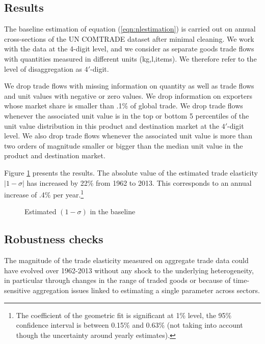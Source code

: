 \documentclass[12pt,twoside,a4paper,notitlepage]{article}
\begin{document}
\subsection{Results}

The baseline estimation of equation (\ref{eqn:nlestimation}) is carried out on annual cross-sections of the UN COMTRADE dataset after minimal cleaning. 
We work with the data at the 4-digit level, and we consider as separate goods trade flows with quantities measured in different units (kg,l,items). 
We therefore refer to the level of disaggregation as $4'$-digit.

We drop trade flows with missing information on quantity as well as trade flows and unit values with negative or zero values.
We drop information on exporters whose market share is smaller than .1\% of global trade. 
We drop trade flows whenever the associated unit value is in the top or bottom 5 percentiles of the unit value distribution in this product and destination market at the $4'$-digit level.
We also drop trade flows whenever the associated unit value is more than two orders of magnitude smaller or bigger than the median unit value in the product and destination market.

Figure \ref{fig:baseline} presents the results.
The absolute value of the estimated trade elasticity $|1-\sigma|$ has increased by 22\% from 1962 to 2013.
This corresponds to an annual increase of .4\% per year.\footnote{The coefficient of the geometric fit is significant at 1\% level, the 95\% confidence interval is between 0.15\% and 0.63\% (not taking into account though the uncertainty around yearly estimates).}

\begin{figure}[h!]
\caption{Estimated $(1-\sigma)$ in the baseline\label{fig:baseline}}
\begin{center}
\setlength{\fboxrule}{1pt} %
\setlength{\fboxsep}{.1in} %
\end{center}
\end{figure}

\subsection{Robustness checks}
The magnitude of the trade elasticity measured on aggregate trade data could have evolved over 1962-2013 without any shock to the underlying heterogeneity, in particular through changes in the range of traded goods or because of time-sensitive aggregation issues linked to estimating a single parameter across sectors. 
\end{document}
